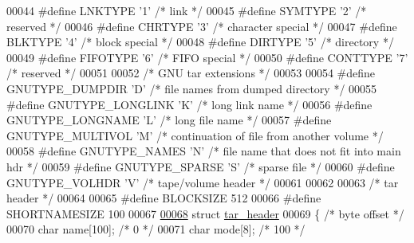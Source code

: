 \begin{DoxyCode}
00044 \textcolor{preprocessor}{#define LNKTYPE  '1'            }\textcolor{comment}{/* link */}\textcolor{preprocessor}{}
00045 \textcolor{preprocessor}{#define SYMTYPE  '2'            }\textcolor{comment}{/* reserved */}\textcolor{preprocessor}{}
00046 \textcolor{preprocessor}{#define CHRTYPE  '3'            }\textcolor{comment}{/* character special */}\textcolor{preprocessor}{}
00047 \textcolor{preprocessor}{#define BLKTYPE  '4'            }\textcolor{comment}{/* block special */}\textcolor{preprocessor}{}
00048 \textcolor{preprocessor}{#define DIRTYPE  '5'            }\textcolor{comment}{/* directory */}\textcolor{preprocessor}{}
00049 \textcolor{preprocessor}{#define FIFOTYPE '6'            }\textcolor{comment}{/* FIFO special */}\textcolor{preprocessor}{}
00050 \textcolor{preprocessor}{#define CONTTYPE '7'            }\textcolor{comment}{/* reserved */}\textcolor{preprocessor}{}
00051 
00052 \textcolor{comment}{/* GNU tar extensions */}
00053 
00054 \textcolor{preprocessor}{#define GNUTYPE\_DUMPDIR  'D'    }\textcolor{comment}{/* file names from dumped directory */}\textcolor{preprocessor}{}
00055 \textcolor{preprocessor}{#define GNUTYPE\_LONGLINK 'K'    }\textcolor{comment}{/* long link name */}\textcolor{preprocessor}{}
00056 \textcolor{preprocessor}{#define GNUTYPE\_LONGNAME 'L'    }\textcolor{comment}{/* long file name */}\textcolor{preprocessor}{}
00057 \textcolor{preprocessor}{#define GNUTYPE\_MULTIVOL 'M'    }\textcolor{comment}{/* continuation of file from another volume */}\textcolor{preprocessor}{}
00058 \textcolor{preprocessor}{#define GNUTYPE\_NAMES    'N'    }\textcolor{comment}{/* file name that does not fit into main hdr */}\textcolor{preprocessor}{}
00059 \textcolor{preprocessor}{#define GNUTYPE\_SPARSE   'S'    }\textcolor{comment}{/* sparse file */}\textcolor{preprocessor}{}
00060 \textcolor{preprocessor}{#define GNUTYPE\_VOLHDR   'V'    }\textcolor{comment}{/* tape/volume header */}\textcolor{preprocessor}{}
00061 
00062 
00063 \textcolor{comment}{/* tar header */}
00064 
00065 \textcolor{preprocessor}{#define BLOCKSIZE     512}
00066 \textcolor{preprocessor}{#define SHORTNAMESIZE 100}
00067 
\hyperlink{structtar__header}{00068} \textcolor{keyword}{struct }\hyperlink{structtar__header}{tar\_header}
00069 \{                               \textcolor{comment}{/* byte offset */}
00070   \textcolor{keywordtype}{char} name[100];               \textcolor{comment}{/*   0 */}
00071   \textcolor{keywordtype}{char} mode[8];                 \textcolor{comment}{/* 100 */}

\end{DoxyCode}
